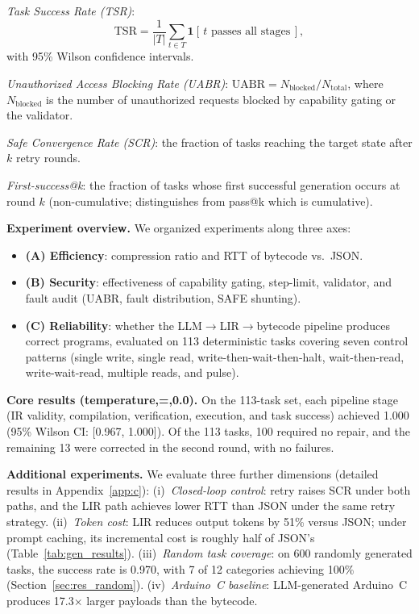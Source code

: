 \documentclass[a4paper,fleqn,longmktitle]{cas-dc}
\begin{document}
\emph{Task Success Rate (TSR)}:
\[
\text{TSR} = \frac{1}{|T|} \sum_{t \in T} \mathbf{1}[\,t \text{ passes all stages}\,],
\]
with 95\% Wilson confidence intervals.

\emph{Unauthorized Access Blocking Rate (UABR)}: $\text{UABR} = N_{\text{blocked}} / N_{\text{total}}$, where $N_{\text{blocked}}$ is the number of unauthorized requests blocked by capability gating or the validator.

\emph{Safe Convergence Rate (SCR)}: the fraction of tasks reaching the target state after $k$ retry rounds.

\emph{First-success@k}: the fraction of tasks whose first successful generation occurs at round $k$ (non-cumulative; distinguishes from pass@k which is cumulative).

\textbf{Experiment overview.} We organized experiments along three axes:
\begin{itemize}[nosep,leftmargin=1.5em]
  \item \textbf{(A) Efficiency}: compression ratio and RTT of bytecode vs.\ JSON.
  \item \textbf{(B) Security}: effectiveness of capability gating, step-limit, validator, and fault audit (UABR, fault distribution, SAFE shunting).
  \item \textbf{(C) Reliability}: whether the LLM$\to$LIR$\to$bytecode pipeline produces correct programs, evaluated on 113 deterministic tasks covering seven control patterns (single write, single read, write-then-wait-then-halt, wait-then-read, write-wait-read, multiple reads, and pulse).
\end{itemize}

\textbf{Core results (temperature,=,0.0).} On the 113-task set, each pipeline stage (IR validity, compilation, verification, execution, and task success) achieved 1.000 (95\% Wilson CI: [0.967, 1.000]). Of the 113 tasks, 100 required no repair, and the remaining 13 were corrected in the second round, with no failures.

\textbf{Additional experiments.} We evaluate three further dimensions (detailed results in Appendix~\ref{app:c}): (i)~\emph{Closed-loop control}: retry raises SCR under both paths, and the LIR path achieves lower RTT than JSON under the same retry strategy. (ii)~\emph{Token cost}: LIR reduces output tokens by 51\% versus JSON; under prompt caching, its incremental cost is roughly half of JSON's (Table~\ref{tab:gen_results}). (iii)~\emph{Random task coverage}: on 600 randomly generated tasks, the success rate is 0.970, with 7 of 12 categories achieving 100\% (Section~\ref{sec:res_random}). (iv)~\emph{Arduino~C baseline}: LLM-generated Arduino~C produces 17.3$\times$ larger payloads than the bytecode.
\end{document}
